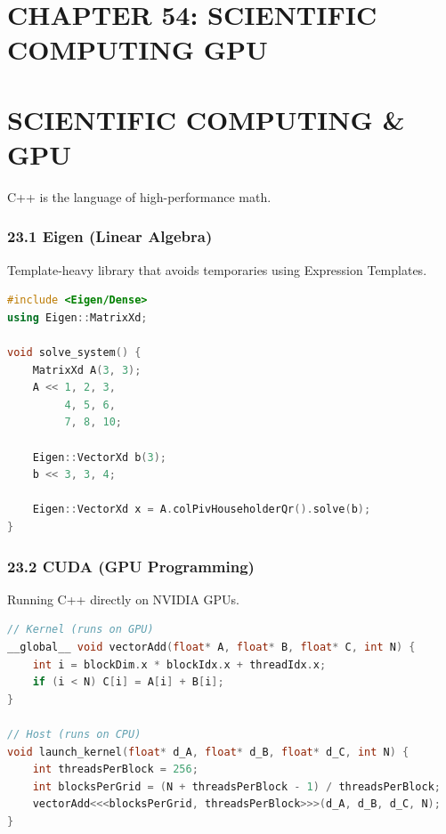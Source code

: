 \hypertarget{chapter-54-scientific-computing-gpu}{%
\section{CHAPTER 54: SCIENTIFIC COMPUTING
GPU}\label{chapter-54-scientific-computing-gpu}}

\hypertarget{scientific-computing-gpu}{%
\section{SCIENTIFIC COMPUTING \& GPU}\label{scientific-computing-gpu}}

C++ is the language of high-performance math.

\hypertarget{eigen-linear-algebra}{%
\subsubsection{23.1 Eigen (Linear Algebra)}\label{eigen-linear-algebra}}

Template-heavy library that avoids temporaries using Expression
Templates.

\begin{lstlisting}[language={C++}]
#include <Eigen/Dense>
using Eigen::MatrixXd;

void solve_system() {
    MatrixXd A(3, 3);
    A << 1, 2, 3,
         4, 5, 6,
         7, 8, 10;

    Eigen::VectorXd b(3);
    b << 3, 3, 4;

    Eigen::VectorXd x = A.colPivHouseholderQr().solve(b);
}
\end{lstlisting}

\hypertarget{cuda-gpu-programming}{%
\subsubsection{23.2 CUDA (GPU Programming)}\label{cuda-gpu-programming}}

Running C++ directly on NVIDIA GPUs.

\begin{lstlisting}[language={C++}]
// Kernel (runs on GPU)
__global__ void vectorAdd(float* A, float* B, float* C, int N) {
    int i = blockDim.x * blockIdx.x + threadIdx.x;
    if (i < N) C[i] = A[i] + B[i];
}

// Host (runs on CPU)
void launch_kernel(float* d_A, float* d_B, float* d_C, int N) {
    int threadsPerBlock = 256;
    int blocksPerGrid = (N + threadsPerBlock - 1) / threadsPerBlock;
    vectorAdd<<<blocksPerGrid, threadsPerBlock>>>(d_A, d_B, d_C, N);
}
\end{lstlisting}
